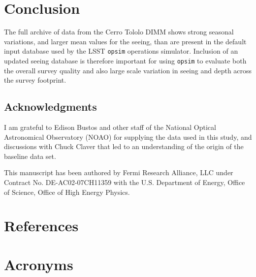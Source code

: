 \documentclass[DM,authoryear,toc]{lsstdoc}
\begin{document}

\section{Conclusion}
\label{sec:conclusion}

The full archive of data from the Cerro Tololo DIMM shows strong
seasonal variations, and larger mean values for the seeing, than are
present in the default input database used by the LSST \texttt{opsim}
operations simulator. Inclusion of an updated seeing database is
therefore important for using \texttt{opsim} to evaluate both the
overall survey quality and also large scale variation in seeing and
depth across the survey footprint.


\subsection*{Acknowledgments}

I am grateful to Edison Bustos and other staff of the National Optical
Astronomical Observatory (NOAO) for supplying the data used in this
study, and discussions with Chuck Claver that led to an understanding
of the origin of the baseline data set.

This manuscript has been authored by Fermi Research Alliance, LLC
under Contract No. DE-AC02-07CH11359 with the U.S. Department of
Energy, Office of Science, Office of High Energy Physics.



\appendix
\section{References} \label{sec:bib}
\renewcommand{\refname}{} %


\section{Acronyms} \label{sec:acronyms}

\end{document}
